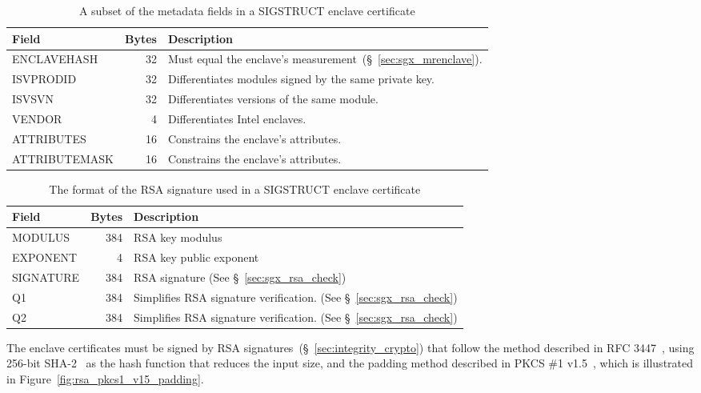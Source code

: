 \begin{table}[hbt]
  \centering
  \begin{tabularx}{\columnwidth}{| l | r | X |}
  \hline
  \textbf{Field} & \textbf{Bytes} & \textbf{Description} \\
  \hline
  ENCLAVEHASH & 32 & Must equal the enclave's
                     measurement~(\S~\ref{sec:sgx_mrenclave}). \\
  \hline
  ISVPRODID & 32 & Differentiates modules signed by the same private key. \\
  \hline
  ISVSVN & 32 & Differentiates versions of the same module. \\
  \hline
  VENDOR & 4 & Differentiates Intel enclaves. \\
  \hline
  ATTRIBUTES & 16 & Constrains the enclave's attributes. \\
  \hline
  ATTRIBUTEMASK & 16 & Constrains the enclave's attributes. \\
  \hline
  \end{tabularx}
  \caption{
    A subset of the metadata fields in a SIGSTRUCT enclave certificate
  }
  \label{fig:sgx_sigstruct_info}
\end{table}

\begin{table}[hbt]
  \centering
  \begin{tabularx}{\columnwidth}{| l | r | X |}
  \hline
  \textbf{Field} & \textbf{Bytes} & \textbf{Description} \\
  \hline
  MODULUS & 384 & RSA key modulus \\
  \hline
  EXPONENT & 4 & RSA key public exponent \\
  \hline
  SIGNATURE & 384 & RSA signature (See \S~\ref{sec:sgx_rsa_check}) \\
  \hline
  Q1 & 384 & Simplifies RSA signature verification.
             (See \S~\ref{sec:sgx_rsa_check}) \\
  \hline
  Q2 & 384 & Simplifies RSA signature verification.
             (See \S~\ref{sec:sgx_rsa_check}) \\
  \hline
  \end{tabularx}
  \caption{
    The format of the RSA signature used in a SIGSTRUCT enclave certificate
  }
  \label{fig:sgx_sigstruct_rsa}
\end{table}

The enclave certificates must be signed by RSA
signatures~(\S~\ref{sec:integrity_crypto}) that follow the method described in
RFC 3447~\cite{jonsson2003pkcsv21}, using 256-bit SHA-2~\cite{fips2015shs} as
the hash function that reduces the input size, and the padding method described
in PKCS \#1 v1.5~\cite{kaliski1998pkcs1v15}, which is illustrated in
Figure~\ref{fig:rsa_pkcs1_v15_padding}.

